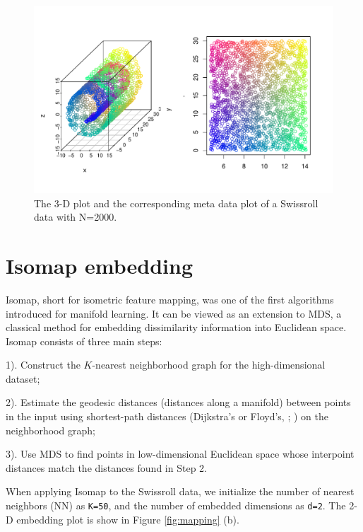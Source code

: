 \documentclass[11pt,a4paper,]{article}
\begin{document}
\begin{figure}

{\centering \includegraphics[width=1\linewidth]{Simulation_files/figure-latex/sr-1} 

}

\caption{The 3-D plot and the corresponding meta data plot of a Swissroll data with N=2000.}\label{fig:sr}
\end{figure}

\hypertarget{isomap-embedding}{%
\section{Isomap embedding}\label{isomap-embedding}}

Isomap, short for isometric feature mapping, was one of the first algorithms introduced for manifold learning.
It can be viewed as an extension to MDS, a classical method for embedding dissimilarity information into Euclidean space. Isomap consists of three main steps:

1). Construct the \(K\)-nearest neighborhood graph for the high-dimensional dataset;

2). Estimate the geodesic distances (distances along a manifold) between points in the input using shortest-path distances (Dijkstra's or Floyd's, \textcite{Dijkstra1959-ml}; \textcite{FloydRobert1962-au}) on the neighborhood graph;

3). Use MDS to find points in low-dimensional Euclidean space whose interpoint distances match the distances found in Step 2.

When applying Isomap to the Swissroll data, we initialize the number of nearest neighbors (NN) as \texttt{K=50}, and the number of embedded dimensions as \texttt{d=2}. The 2-D embedding plot is show in Figure \ref{fig:mapping} (b).
\end{document}
